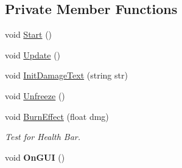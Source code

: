 \subsection*{Private Member Functions}
\begin{DoxyCompactItemize}
\item 
void \hyperlink{class_mob_health_af397aaaf764c7338aa1a83714537a68a}{Start} ()
\item 
void \hyperlink{class_mob_health_a0652c8b5a2fcb5cb791eb26305425024}{Update} ()
\item 
void \hyperlink{class_mob_health_a13e17984b18c95b8e6d56f52f9e11a71}{Init\+Damage\+Text} (string str)
\item 
void \hyperlink{class_mob_health_aa6acd5f6aad4b4d621db7d927169cd70}{Unfreeze} ()
\item 
void \hyperlink{class_mob_health_aba4ed1f920f770c312d214e541620f9f}{Burn\+Effect} (float dmg)
\begin{DoxyCompactList}\small\item\em Test for Health Bar. \end{DoxyCompactList}\item 
\mbox{\label{class_mob_health_ae30ec0b3661db3d9306ead156bcc90c2}} 
void {\bfseries On\+G\+UI} ()
\end{DoxyCompactItemize}

